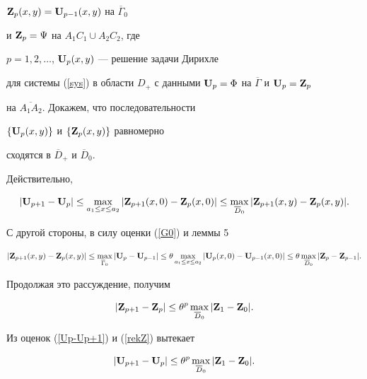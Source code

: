 ${\bold Z}_p(x,y)={\bold U}_{p-1}(x,y)$ на $\overline \Gamma_0$


и ${\bold Z}_p=\Psi$ на ${A_1C_1 \cup A_2C_2}$, где


$p=1,2,\dotsc$, ${\bold U}_p(x,y)$ --- решение задачи Дирихле


для системы (\ref{sys}) в области $D_+$ с данными ${\bold


U}_p=\Phi$ на $\overline \Gamma$ и ${\bold U}_p={\bold Z}_p$


на $\overline {A_1A_2}$. Докажем, что последовательности


$\{{\bold U}_p(x,y)\}$ и $\{{\bold Z}_p(x,y)\}$ равномерно


сходятся в $\overline D_+$ и $\overline D_0$.


Действительно,


\begin{equation}\label{Up-Up+1}


|{\bold U}_{p+1}-{\bold U}_p|\le\max_{a_1\le x\le a_2}


|{\bold Z}_{p+1}(x,0)-{\bold


Z}_p(x,0)|\le\max_{\overline D_0}|{\bold


Z}_{p+1}(x,y)-{\bold Z}_p(x,y)|.


\end{equation}


С другой стороны, в силу оценки (\ref{G0}) и леммы 5


$$


|{\bold Z}_{p+1}(x,y)-{\bold Z}_p(x,y)|\le\max_{\overline \Gamma_0}


|{\bold U}_p-{\bold U}_{p-1}|\le\theta


\max_{a_1\le x\le a_2}|{\bold U}_p(x,0)-{\bold U}_{p-1}(x,0)|\le \theta


\max_{\overline D_0}|{\bold Z}_p-{\bold Z}_{p-1}|.


$$


Продолжая это рассуждение, получим


\begin{equation}\label{rekZ}


|{\bold Z}_{p+1}-{\bold Z}_p|\le \theta^p


\max_{\overline D_0}|{\bold Z}_1-{\bold Z}_0|.


\end{equation}


Из оценок (\ref{Up-Up+1}) и (\ref{rekZ}) вытекает


\begin{equation}\label{rekU}


|{\bold U}_{p+1}-{\bold U}_p|\le \theta^p


\max_{\overline D_0}|{\bold Z}_1-{\bold Z}_0|.


\end{equation}


